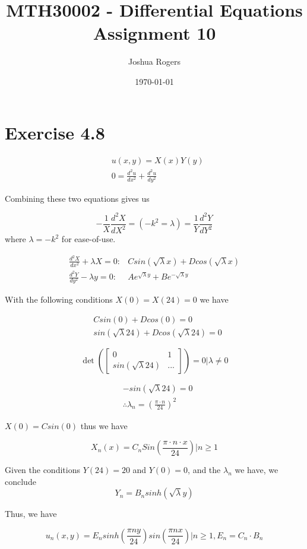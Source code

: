 \documentclass{article}
\title{\vspace{-4cm}MTH30002 - Differential Equations Assignment 10}
\author{Joshua Rogers}
\date\today
\begin{document}
\maketitle
\section*{Exercise 4.8}

\begin{align*}
& u(x,y) = X(x)Y(y) \\
& 0 = \frac{d^2u}{dx^2} + \frac{d^2u}{dy^2}
\end{align*}

Combining these two equations gives us

$$-\frac{1}{X} \frac{d^2X}{dX^2} = (-k^2 = \lambda) = \frac{1}{Y} \frac{d^2Y}{dY^2}$$
where $\lambda = -k^2$ for ease-of-use.

\begin{align*}
\frac{d^2X}{dx^2} + \lambda X =0: &Csin(\sqrt\lambda x) + Dcos(\sqrt\lambda x)\\
\frac{d^2Y}{dy^2}-\lambda y=0: &Ae^{\sqrt\lambda y} + Be^{-\sqrt\lambda y}
\end{align*}

With the following conditions
$X(0) = X(24) = 0$ we have

\begin{align*}
&Csin(0) + Dcos(0) = 0\\
&sin(\sqrt\lambda 24) + Dcos(\sqrt\lambda 24) =0
\end{align*}

$$\det \left( \begin{bmatrix} 0 & 1 \\ sin(\sqrt\lambda 24) & ... \end{bmatrix} \right) = 0 \Bigr| \lambda \neq 0 $$

\begin{align*}
&-sin(\sqrt\lambda 24)=0\\
& \therefore \lambda_n = \left(\frac{\pi \cdot n}{24}\right)^2
\end{align*}

$X(0) = Csin(0)$ thus we have

$$X_n(x) = C_nSin\left(\frac{\pi \cdot n \cdot x}{24}\right)\Bigr| n\geq 1$$

Given the conditions $Y(24)=20$ and $Y(0)=0$, and the $\lambda_n$ we have, we conclude
$$Y_n=B_nsinh\left(\sqrt\lambda y\right)$$

Thus, we have

$$u_n(x,y) = E_nsinh\left(\frac{\pi n y}{24}\right) sin\left(\frac{\pi n x}{24}\right)\Bigr| n \geq 1, E_n = C_n \cdot B_n$$
\end{document}
